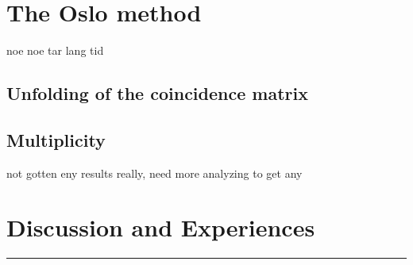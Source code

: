 \documentclass[11pt,a4wide]{article}
\begin{document}
\section{The Oslo method}
noe noe tar lang tid

\subsection{Unfolding of the coincidence matrix}

\subsection{Multiplicity}


not gotten eny results really, need more analyzing to get any
\section{Discussion and Experiences}


\noindent\rule{\textwidth}{1pt}
\end{document}
